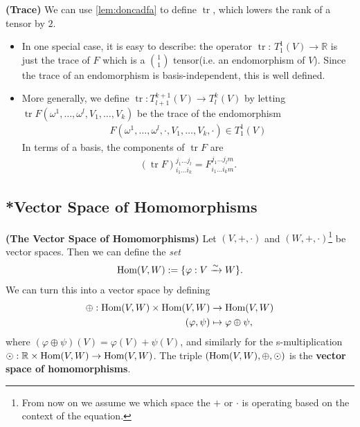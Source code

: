 \documentclass[12pt]{article} %
\newcommand{\bfs}[1]{\textbf{({#1}) }}
\begin{document}
\begin{defa}\bfs{Trace}
We can use \cref{lem:doncadfa} to define  $\operatorname{tr}$, which lowers the rank of a tensor by $2$. 
\begin{itemize}
    \item In one special case, it is easy to describe: the operator $\operatorname{tr}$: $T_{1}^{1}(V) \rightarrow \mathbb{R}$ is just the trace of $F$ which is a $\binom{1}{1}$ tensor(i.e. an endomorphism of $V$). Since the trace of an endomorphism is basis-independent, this is well defined. 
    \item 
More generally, we define $\operatorname{tr}: T_{l+1}^{k+1}(V) \rightarrow T_{l}^{k}(V)$ by letting $\operatorname{tr} F\left(\omega^{1}, \ldots, \omega^{l}, V_{1}, \ldots, V_{k}\right)$ be the trace of the endomorphism
\begin{align*}
F\left(\omega^{1}, \ldots, \omega^{l}, \cdot, V_{1}, \ldots, V_{k}, \cdot\right) \in T_{1}^{1}(V)
\end{align*}
In terms of a basis, the components of $\operatorname{tr} F$ are
\begin{align*}
(\operatorname{tr} F)_{i_{1} \ldots i_{k}}^{j_{1} \ldots j_{l}}=F_{i_{1} \ldots i_{k} m}^{j_{1} \ldots j_{l} m} .
\end{align*}
\end{itemize}
\end{defa}
\subsection{*Vector Space of Homomorphisms}
\bd\bfs{The Vector Space of Homomorphisms}
    Let $(V,+,\cdot)$ and $(W,+,\cdot)$\footnote{From now on we assume we which space the $+$ or $\cdot$ is operating based on the context of the equation.} be vector spaces. Then we can define the \textit{set}
    \begin{align*}
        \text{Hom}(V,W) := \{ \varphi : V \xrightarrow{\sim} W \}. 
    \end{align*}
    We can turn this into a vector space by defining 
        \begin{align*}
            \oplus : \text{Hom}(V,W) \times \text{Hom}(V,W) & \to \text{Hom}(V,W) \\
            (\varphi,\psi) & \mapsto \varphi \oplus \psi,
        \end{align*}
    where $(\varphi\oplus \psi)(V) = \varphi(V) + \psi(V)$, and similarly for the s-multiplication $\odot : \mathbb{R} \times \text{Hom}(V,W) \to \text{Hom}(V,W)$. The triple $(\text{Hom}(V,W),\oplus,\odot)$ is the \textbf{vector space of homomorphisms}. 
\ed 
\end{document}
